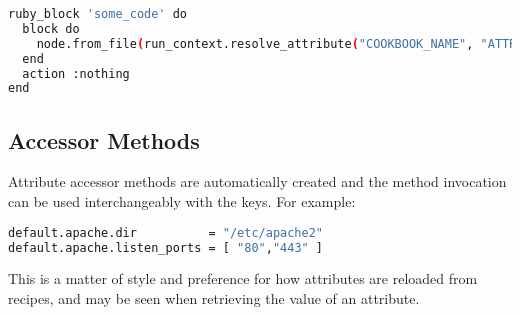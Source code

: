 \begin{lstlisting}[language=Bash,label=lst:cookbook-recipes12]
ruby_block 'some_code' do
  block do
    node.from_file(run_context.resolve_attribute("COOKBOOK_NAME", "ATTR_FILE"))
  end
  action :nothing
end
\end{lstlisting}

\subsection{Accessor Methods}

Attribute accessor methods are automatically created and the method invocation can be used interchangeably with the keys. For example:

\begin{lstlisting}[language=Bash,label=lst:cookbook-recipes13]
default.apache.dir          = "/etc/apache2"
default.apache.listen_ports = [ "80","443" ]
\end{lstlisting}

This is a matter of style and preference for how attributes are reloaded from recipes, and may be seen when retrieving the value of an attribute.
